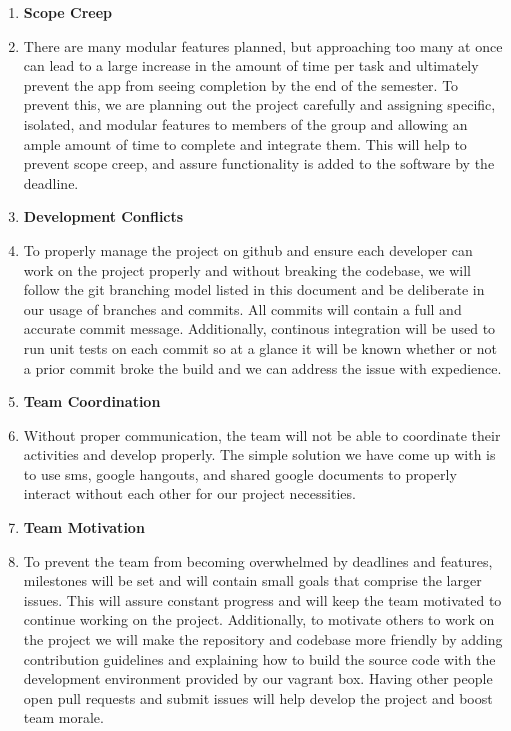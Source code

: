 \documentclass{scrreprt}
\begin{document}
\begin{enumerate}
	\item[] \textbf{Scope Creep}
	\item There are many modular features planned, but approaching too many at once can lead to a large increase in the amount of time per task and ultimately prevent the app from seeing completion by the end of the semester. To prevent this, we are planning out the project carefully and assigning specific, isolated, and modular features to members of the group and allowing an ample amount of time to complete and integrate them. This will help to prevent scope creep, and assure functionality is added to the software by the deadline.
	
	\item[] \textbf{Development Conflicts}
	\item To properly manage the project on github and ensure each developer can work on the project properly and without breaking the codebase, we will follow the git branching model listed in this document and be deliberate in our usage of branches and commits. All commits will contain a full and accurate commit message. Additionally, continous integration will be used to run unit tests on each commit so at a glance it will be known whether or not a prior commit broke the build and we can address the issue with expedience.
	
	\item[] \textbf{Team Coordination}
	\item Without proper communication, the team will not be able to coordinate their activities and develop properly. The simple solution we have come up with is to use sms, google hangouts, and shared google documents to properly interact without each other for our project necessities.
	
	\pagebreak
	
	\item[] \textbf{Team Motivation}
	\item To prevent the team from becoming overwhelmed by deadlines and features, milestones will be set and will contain small goals that comprise the larger issues. This will assure constant progress and will keep the team motivated to continue working on the project. Additionally, to motivate others to work on the project we will make the repository and codebase more friendly by adding contribution guidelines and explaining how to build the source code with the development environment provided by our vagrant box. Having other people open pull requests and submit issues will help develop the project and boost team morale.
\end{enumerate}
\end{document}
